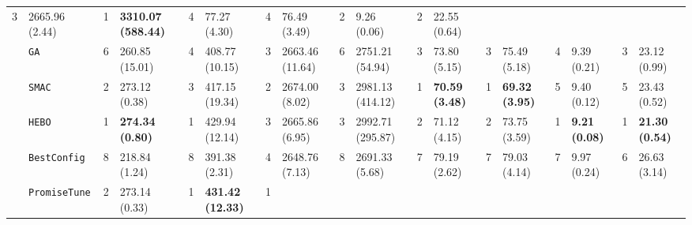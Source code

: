 \begin{tabular}{clllllllllllllllll}
  3 &
  \multicolumn{1}{l|}{2665.96 (2.44)} &
  \cellcolor{blue!15}1 &
  \multicolumn{1}{l|}{\cellcolor{blue!15}\textbf{3310.07 (588.44)}} &
  4 &
  \multicolumn{1}{l|}{77.27 (4.30)} &
  4 &
  \multicolumn{1}{l|}{76.49 (3.49)} &
  2 &
  \multicolumn{1}{l|}{9.26 (0.06)} &
  2 &
  22.55 (0.64) \\
\multicolumn{1}{c|}{} &
  \multicolumn{1}{l|}{\texttt{GA}} &
  6 &
  \multicolumn{1}{l|}{260.85 (15.01)} &
  4 &
  \multicolumn{1}{l|}{408.77 (10.15)} &
  3 &
  \multicolumn{1}{l|}{2663.46 (11.64)} &
  6 &
  \multicolumn{1}{l|}{2751.21 (54.94)} &
  3 &
  \multicolumn{1}{l|}{73.80 (5.15)} &
  3 &
  \multicolumn{1}{l|}{75.49 (5.18)} &
  4 &
  \multicolumn{1}{l|}{9.39 (0.21)} &
  3 &
  23.12 (0.99) \\
\multicolumn{1}{c|}{} &
  \multicolumn{1}{l|}{\texttt{SMAC}} &
  2 &
  \multicolumn{1}{l|}{273.12 (0.38)} &
  3 &
  \multicolumn{1}{l|}{417.15 (19.34)} &
  2 &
  \multicolumn{1}{l|}{2674.00 (8.02)} &
  3 &
  \multicolumn{1}{l|}{2981.13 (414.12)} &
  \cellcolor{blue!15}1 &
  \multicolumn{1}{l|}{\cellcolor{blue!15}\textbf{70.59 (3.48)}} &
  \cellcolor{blue!15}1 &
  \multicolumn{1}{l|}{\cellcolor{blue!15}\textbf{69.32 (3.95)}} &
  5 &
  \multicolumn{1}{l|}{9.40 (0.12)} &
  5 &
  23.43 (0.52) \\
\multicolumn{1}{c|}{} &
  \multicolumn{1}{l|}{\texttt{HEBO}} &
  \cellcolor{blue!15}1 &
  \multicolumn{1}{l|}{\cellcolor{blue!15}\textbf{274.34 (0.80)}} &
  \cellcolor{blue!15}1 &
  \multicolumn{1}{l|}{\cellcolor{blue!15}429.94 (12.14)} &
  3 &
  \multicolumn{1}{l|}{2665.86 (6.95)} &
  3 &
  \multicolumn{1}{l|}{2992.71 (295.87)} &
  2 &
  \multicolumn{1}{l|}{71.12 (4.15)} &
  2 &
  \multicolumn{1}{l|}{73.75 (3.59)} &
  \cellcolor{blue!15}1 &
  \multicolumn{1}{l|}{\cellcolor{blue!15}\textbf{9.21 (0.08)}} &
  \cellcolor{blue!15}1 &
  \cellcolor{blue!15}\textbf{21.30 (0.54)} \\
\multicolumn{1}{c|}{} &
  \multicolumn{1}{l|}{\texttt{BestConfig}} &
  8 &
  \multicolumn{1}{l|}{218.84 (1.24)} &
  8 &
  \multicolumn{1}{l|}{391.38 (2.31)} &
  4 &
  \multicolumn{1}{l|}{2648.76 (7.13)} &
  8 &
  \multicolumn{1}{l|}{2691.33 (5.68)} &
  7 &
  \multicolumn{1}{l|}{79.19 (2.62)} &
  7 &
  \multicolumn{1}{l|}{79.03 (4.14)} &
  7 &
  \multicolumn{1}{l|}{9.97 (0.24)} &
  6 &
  26.63 (3.14) \\
\multicolumn{1}{c|}{} &
  \multicolumn{1}{l|}{\texttt{PromiseTune}} &
  2 &
  \multicolumn{1}{l|}{273.14 (0.33)} &
  \cellcolor{blue!15}1 &
  \multicolumn{1}{l|}{\cellcolor{blue!15}\textbf{431.42 (12.33)}} &
  \cellcolor{blue!15}1 &

\end{tabular}
